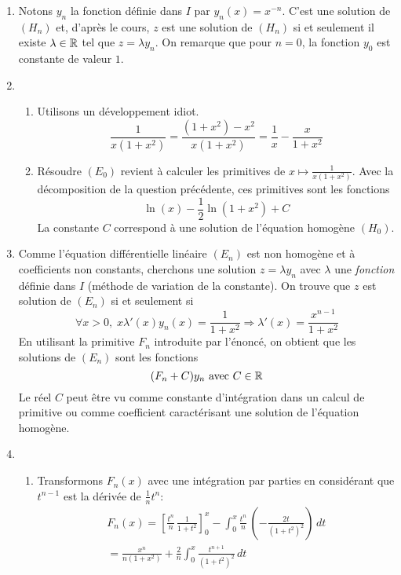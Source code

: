 \begin{enumerate}
  \item Notons $y_n$ la fonction définie dans $I$ par $y_n(x) = x^{-n}$. C'est une solution de $(H_n)$ et, d'après le cours, $z$ est une solution de $(H_n)$ si et seulement il existe $\lambda\in \mathbb{R}$ tel que $z=\lambda y_n$. On remarque que pour $n=0$, la fonction $y_0$ est constante de valeur $1$.
  \item
\begin{enumerate}
  \item Utilisons un \og développement idiot\fg.
\begin{displaymath}
\frac{1}{x(1+x^2)} = \frac{(1+x^2)-x^2}{x(1+x^2)} = \frac{1}{x} - \frac{x}{1+x^2}  
\end{displaymath}
  \item Résoudre $(E_0)$ revient à calculer les primitives de $x\mapsto \frac{1}{x(1+x^2)}$. Avec la décomposition de la question précédente, ces primitives sont les fonctions
\begin{displaymath}
  \ln(x) -\frac{1}{2}\ln(1+x^2) + C
\end{displaymath}
La constante $C$ correspond à une solution de l'équation homogène $(H_0)$.
\end{enumerate}

  \item Comme l'équation différentielle linéaire $(E_n)$ est non homogène et à coefficients non constants, cherchons une solution $z=\lambda y_n$ avec $\lambda$ une \emph{fonction} définie dans $I$ (méthode de variation de la constante).\newline
  On trouve que $z$ est solution de $(E_n)$ si et seulement si 
\begin{displaymath}
\forall x>0,\; x\lambda'(x)y_n(x) =  \frac{1}{1+x^2} \Rightarrow \lambda'(x) =  \frac{x^{n-1}}{1+x^2}
\end{displaymath}
En utilisant la primitive $F_n$ introduite par l'énoncé, on obtient que les solutions de $(E_n)$ sont les fonctions
\begin{displaymath}
  (F_n + C)y_n \text{ avec } C\in \mathbb{R}
\end{displaymath}
Le réel $C$ peut être vu comme constante d'intégration dans un calcul de primitive ou comme coefficient caractérisant une solution de l'équation homogène.

 
 \item 
\begin{enumerate}
  \item Transformons $F_n(x)$ avec une intégration par parties en considérant que $t^{n-1}$ est la dérivée de $\frac{1}{n}t^n$:
\begin{multline*}
F_n(x) = \left[ \frac{t^n}{n}\, \frac{1}{1+t^2}\right]_{0}^{x}
- \int_0^x \frac{t^n}{n}\,\left( -\frac{2t}{(1+t^2)^2}\right)\,dt \\
= \frac{x^n}{n(1+x^2)} + \frac{2}{n}\int_0^x\frac{t^{n+1}}{(1+t^2)^2}\,dt
\end{multline*}


\end{enumerate}
\end{enumerate}
